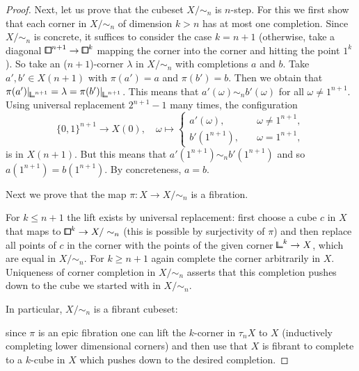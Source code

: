 \begin{proof}
Next, let us prove that the cubeset $X/\sim_n$ is $n$-step.
For this we first show that each corner in $X/\sim_n$ of dimension $k > n$ has at most one completion.
Since $X/\sim_n$ is concrete, it suffices to consider the case $k = n+1$ (otherwise, take a diagonal ${\bbox}^{n+1}\to{\bbox}^k$ mapping the corner into the corner and hitting the point $1^k$).
So take an ($n+1$)-corner $\lambda$ in $X/\sim_n$ with completions $a$ and $b$.
Take $a',b'\in X(n+1)$ with $\pi(a') = a$ and $\pi(b') = b$.
Then we obtain that $\pi(a')\rvert_{{\bbcor}^{n+1}} = \lambda = \pi(b')\rvert_{{\bbcor}^{n+1}}$.
This means that $a'(\omega) \sim_n b'(\omega)$ for all $\omega\neq 1^{n+1}$.
Using universal replacement $2^{n+1}-1$ many times, the configuration
\[
    \{0,1\}^{n+1}\to X(0),\quad\omega\mapsto\begin{cases}
        a'(\omega),\quad &\omega\neq 1^{n+1}, \\
        b'(1^{n+1}),\quad &\omega = 1^{n+1},
    \end{cases}
\]
is in $X(n+1)$.
But this means that $a'(1^{n+1}) \sim_n b'(1^{n+1})$ and so $a(1^{n+1}) = b(1^{n+1})$.
By concreteness, $a = b$.

Next we prove that the map $\pi\colon X\to X/\sim_n$ is a fibration.
\begin{center}
\end{center}
For $k\leq n+1$ the lift exists by universal replacement: first choose a cube $c$ in $X$ that maps to ${\bbox}^k\to X/\sim_n$
(this is possible by surjectivity of $\pi$) and then replace all points of $c$ in the corner with the points of the given corner ${\bbcor}^k\to X$,
which are equal in $X/\sim_n$.
For $k\geq n+1$ again complete the corner arbitrarily in $X$.
Uniqueness of corner completion in $X/\sim_n$ asserts that this completion pushes down to the cube we started with in $X/\sim_n$.

In particular, $X/\sim_n$ is a fibrant cubeset:
\begin{center}
\end{center}
since $\pi$ is an epic fibration one can lift the $k$-corner in $\tau_nX$ to $X$ (inductively completing lower dimensional corners) and then use that $X$ is fibrant to complete to a $k$-cube in $X$ which pushes down to the desired completion.


\end{proof}
